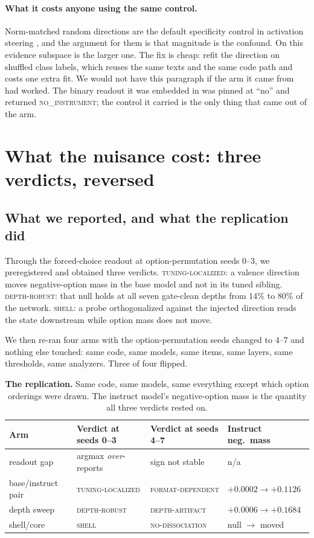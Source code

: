 \documentclass{article}
\begin{document}
\paragraph{What it costs anyone using the same control.} Norm-matched random directions are the
default specificity control in activation steering \citep{turner2023, rimsky2023}, and the argument
for them is that magnitude is the confound. On this evidence subspace is the larger one. The fix is
cheap: refit the direction on shuffled class labels, which reuses the same texts and the same code
path and costs one extra fit. We would not have this paragraph if the arm it came from had worked.
The binary readout it was embedded in was pinned at ``no'' and returned \textsc{no\_instrument}; the
control it carried is the only thing that came out of the arm.

\section{What the nuisance cost: three verdicts, reversed}
\label{sec:retracted}

\subsection{What we reported, and what the replication did}
\label{sec:readjudicate}

Through the forced-choice readout at option-permutation seeds $0$--$3$, we preregistered and
obtained three verdicts. \textsc{tuning-localized}: a valence direction moves negative-option mass
in the base model and not in its tuned sibling. \textsc{depth-robust}: that null holds at all seven
gate-clean depths from $14\%$ to $80\%$ of the network. \textsc{shell}: a probe orthogonalized
against the injected direction reads the state downstream while option mass does not move.

We then re-ran four arms with the option-permutation seeds changed to $4$--$7$ and nothing else
touched: same code, same models, same items, same layers, same thresholds, same analyzers. Three of
four flipped.

\begin{table}[t]
\centering
\small
\caption{\textbf{The replication.} Same code, same models, same everything except which option
orderings were drawn. The instruct model's negative-option mass is the quantity all three verdicts
rested on.}
\label{tab:replication}
\begin{tabular}{@{}llll@{}}
\toprule
\textbf{Arm} & \textbf{Verdict at seeds 0--3} & \textbf{Verdict at seeds 4--7} & \textbf{Instruct neg.\ mass} \\
\midrule
readout gap & argmax \emph{over}-reports & sign not stable & n/a \\
base/instruct pair & \textsc{tuning-localized} & \textsc{format-dependent} & $+0.0002 \to +0.1126$ \\
depth sweep & \textsc{depth-robust} & \textsc{depth-artifact} & $+0.0006 \to +0.1684$ \\
shell/core & \textsc{shell} & \textsc{no-dissociation} & null $\to$ moved \\
\bottomrule
\end{tabular}
\end{table}
\end{document}

